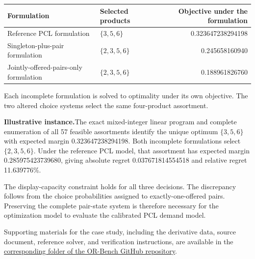 \documentclass[10pt]{article}
\newcommand{\evidencebox}[1]{%
  \par\vspace{3pt}\noindent
  \colorbox{orlight}{%
    \parbox{\dimexpr\linewidth-2\fboxsep\relax}{%
      \small\textbf{Illustrative instance.}\hspace{0.35em}#1%
    }%
  }\par\vspace{4pt}
}
\begin{document}
\begin{center}
\label{tab:decisions}
\begin{tabularx}{0.94\linewidth}{lY r}
\toprule
Formulation & Selected products & Objective under the formulation \\
\midrule
Reference PCL formulation & $\{3,5,6\}$ & 0.323647238294198 \\
Singleton-plus-pair formulation & $\{2,3,5,6\}$ & 0.245658160940 \\
Jointly-offered-pairs-only formulation & $\{2,3,5,6\}$ & 0.188961826760 \\
\bottomrule
\end{tabularx}
\end{center}

Each incomplete formulation is solved to optimality under its own objective. The two altered choice systems select the same four-product assortment.

\evidencebox{The exact mixed-integer linear program and complete enumeration of all 57 feasible assortments identify the unique optimum $\{3,5,6\}$ with expected margin 0.323647238294198. Both incomplete formulations select $\{2,3,5,6\}$. Under the reference PCL model, that assortment has expected margin 0.285975423739680, giving absolute regret 0.037671814554518 and relative regret 11.639776\%.}

The display-capacity constraint holds for all three decisions. The discrepancy follows from the choice probabilities assigned to exactly-one-offered pairs. Preserving the complete pair-state system is therefore necessary for the optimization model to evaluate the calibrated PCL demand model.

Supporting materials for the case study, including the derivative data, source document, reference solver, and verification instructions, are available in the \href{https://github.com/Zhengzhong-You/OR-Bench/tree/main/problems/03_pcl_assortment}{corresponding folder of the OR-Bench GitHub repository}.
\end{document}
